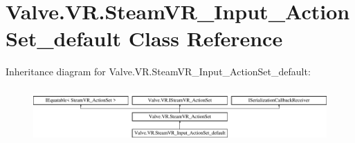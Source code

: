 \hypertarget{class_valve_1_1_v_r_1_1_steam_v_r___input___action_set__default}{}\section{Valve.\+V\+R.\+Steam\+V\+R\+\_\+\+Input\+\_\+\+Action\+Set\+\_\+default Class Reference}
\label{class_valve_1_1_v_r_1_1_steam_v_r___input___action_set__default}
Inheritance diagram for Valve.\+V\+R.\+Steam\+V\+R\+\_\+\+Input\+\_\+\+Action\+Set\+\_\+default\+:\begin{figure}[H]
\begin{center}
\leavevmode
\includegraphics[height=2.081784cm]{class_valve_1_1_v_r_1_1_steam_v_r___input___action_set__default}
\end{center}
\end{figure}

